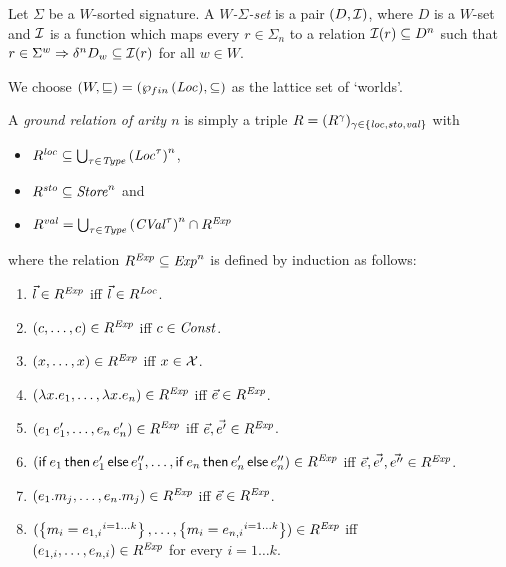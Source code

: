 \documentclass[12pt,a4paper]{report}
\begin{document}
\begin{definition}
  Let $\Sigma$ be a $W$-sorted signature. A {\em $W$-$\Sigma$-set} is a pair
  $(D,\mathcal{I})$, where $D$ is a $W$-set and $\mathcal{I}$ is a function which maps every
  $r \in \Sigma_n$ to a relation $\mathcal{I}(r) \subseteq D^n$ such that
  $r \in \Sigma^w \Rightarrow \delta^n D_w \subseteq \mathcal{I}(r)$ for all $w \in W$.
\end{definition}

We choose $(W,\sqsubseteq) = (\wp_{fin}\,(\mathit{Loc}),\subseteq)$ as the lattice set of `worlds'.

\begin{definition}
  A {\em ground relation of arity $n$} is simply a triple $R = (R^\gamma)_{\gamma\in\{\mathit{loc},\mathit{sto},\mathit{val}\}}$ with
  \begin{itemize}
    \item $R^{\mathit{loc}} \subseteq \bigcup_{\tau\in\mathit{Type}} \left(\mathit{Loc}^\tau\right)^n$,
    \item $R^{\mathit{sto}} \subseteq \mathit{Store}^n$ and
    \item $R^{\mathit{val}} = \bigcup_{\tau\in\mathit{Type}} \left(\mathit{CVal}^\tau\right)^n \cap R^{\mathit{Exp}}$
  \end{itemize}
  where the relation $R^{\mathit{Exp}} \subseteq \mathit{Exp}^n$ is defined by induction as follows:
  \begin{enumerate}
    \item $\vec{l}\in R^{\mathit{Exp}}$ iff $\vec{l}\in R^{\mathit{Loc}}$.
    \item $(c,\ldots,c)\in R^{\mathit{Exp}}$ iff $c\in\mathit{Const}$.
    \item $(x,\ldots,x)\in R^{\mathit{Exp}}$ iff $x\in\mathcal{X}$.
    \item $(\lambda x.e_1,\ldots,\lambda x.e_n)\in R^{\mathit{Exp}}$ iff $\vec{e}\in R^{\mathit{Exp}}$.
    \item $(e_1\,e_1',\ldots,e_n\,e_n')\in R^{\mathit{Exp}}$ iff $\vec{e},\vec{e'}\in R^{\mathit{Exp}}$.
    \item $(\mathsf{if}\,e_1\,\mathsf{then}\,e_1'\,\mathsf{else}\,e_1'',\ldots,\mathsf{if}\,e_n\,\mathsf{then}\,e_n'\,\mathsf{else}\,e_n'')\in R^{\mathit{Exp}}$ iff
          $\vec{e},\vec{e'},\vec{e''}\in R^{\mathit{Exp}}$.
    \item $(e_1.m_j,\ldots,e_n.m_j)\in R^{\mathit{Exp}}$ iff $\vec{e}\in R^{\mathit{Exp}}$.
    \item $(\left\{{m_i=e_{1,i}}^{i=1 \ldots k}\right\},\ldots,\left\{{m_i=e_{n,i}}^{i=1 \ldots k}\right\})\in R^{\mathit{Exp}}$ iff \\
            $(e_{1,i},\ldots,e_{n,i})\in R^{\mathit{Exp}}$ for every $i=1 \ldots k$.
  \end{enumerate}
\end{definition}
\end{document}
